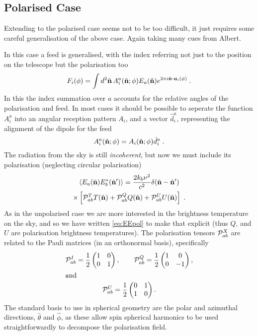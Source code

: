 \documentclass[prd,twocolumn,nofootinbib]{revtex4}
\begin{document}
\subsection{Polarised Case}

Extending to the polarised case seems not to be too difficult, it just requires
some careful generalisation of the above case. Again taking many cues from
Albert.

In this case a feed is generalised, with the index referring not just to the
position on the telescope but the polarisation too
\begin{equation}
  F_i(\phi) = \int d^2\hat{\mathbf{n}} \, A^a_i(\hat{\mathbf{n}}; \phi) E_a(\hat{\mathbf{n}}) e^{2 \pi i
    \hat{\mathbf{n}}\cdot\mathbf{u}_i(\phi)}\; .
\end{equation}
In this the index summation over $a$ accounts for the relative angles of the
polarisation and feed. In most cases it should be possible to seperate the
function $A_i^a$ into an angular reception pattern $A_i$, and a vector
$\hat{d}_i^a$, representing the alignment of the dipole for the feed
\begin{equation}
  A_i^a(\hat{\mathbf{n}}; \phi) = A_i(\hat{\mathbf{n}}; \phi) \hat{d}^a_i \; .
\end{equation}
The radiation from the sky is still \emph{incoherent}, but now we must include
its polarisation (neglecting circular polarisation)
\begin{multline}
\label{eq:EEpol}
  \left\langle E_a(\hat{\mathbf{n}}) E_b^* (\hat{\mathbf{n}}') \right\rangle = \frac{2 k_b \nu^2}{c^2} \delta(\hat{\mathbf{n}} - \hat{\mathbf{n}}') \\ \times \left[\mathcal{P}_{ab}^T
    T(\hat{\mathbf{n}}) + \mathcal{P}_{ab}^Q Q(\hat{\mathbf{n}}) + \mathcal{P}_{ab}^U U(\hat{\mathbf{n}})\right] \; .
\end{multline}
As in the unpolarised case we are more interested in the brightness temperature
on the sky, and so we have written \eqref{eq:EEpol} to make that explicit (thus
$Q$, and $U$ are polarisation brightness temperatures). The polarisation tensors
$\mathcal{P}^X_{ab}$ are related to the Pauli matrices (in an orthonormal basis),
specifically
\begin{gather}
\mathcal{P}^I_{ab} = \frac{1}{2}\begin{pmatrix} 1 & 0 \\ 0 & 1\end{pmatrix},
\qquad
\mathcal{P}^Q_{ab} = \frac{1}{2}\begin{pmatrix} 1 & 0 \\ 0 & -1\end{pmatrix},
\\ \intertext{and}
\mathcal{P}^U_{ab} = \frac{1}{2}\begin{pmatrix} 0 & 1 \\ 1 & 0\end{pmatrix}.
\end{gather}
The standard basis to use in spherical geometry are the polar and azimuthal
directions, $\hat{\theta}$ and $\hat{\phi}$, as these allow spin spherical
harmonics to be used straightforwardly to decompose the polarisation field.
\end{document}

